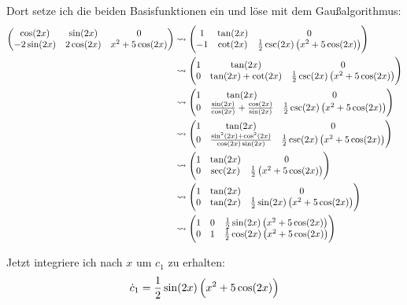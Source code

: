 \documentclass[11pt, ngerman]{article}
\begin{document}
Dort setze ich die beiden Basisfunktionen ein und löse mit dem Gaußalgorithmus:
\begin{align*}
	\begin{pmatrix}
		\cos(2x) & \sin(2x) & 0 \\
		- 2 \sin(2x) & 2 \cos(2x) & x^2 + 5 \cos(2x)
	\end{pmatrix}
	&\leadsto
	\begin{pmatrix}
		1 & \tan(2x) & 0 \\
		-1 & \cot(2x) & \frac 12 \csc(2x) \del{x^2 + 5 \cos(2x)}
	\end{pmatrix} \\
	&\leadsto
	\begin{pmatrix}
		1 & \tan(2x) & 0 \\
		0 & \tan(2x) + \cot(2x) & \frac 12 \csc(2x) \del{x^2 + 5 \cos(2x)}
	\end{pmatrix} \\
	&\leadsto
	\begin{pmatrix}
		1 & \tan(2x) & 0 \\
		0 & \frac{\sin(2x)}{\cos(2x)} + \frac{\cos(2x)}{\sin(2x)} & \frac 12 \csc(2x) \del{x^2 + 5 \cos(2x)}
	\end{pmatrix} \\
	&\leadsto
	\begin{pmatrix}
		1 & \tan(2x) & 0 \\
		0 & \frac{\sin^2(2x) + \cos^2(2x)}{\cos(2x)\sin(2x)} & \frac 12 \csc(2x) \del{x^2 + 5 \cos(2x)}
	\end{pmatrix} \\
	&\leadsto
	\begin{pmatrix}
		1 & \tan(2x) & 0 \\
		0 & \sec(2x) & \frac 12 \del{x^2 + 5 \cos(2x)}
	\end{pmatrix} \\
	&\leadsto
	\begin{pmatrix}
		1 & \tan(2x) & 0 \\
		0 & \tan(2x) & \frac 12 \sin(2x) \del{x^2 + 5 \cos(2x)}
	\end{pmatrix} \\
	&\leadsto
	\begin{pmatrix}
		1 & 0 & \frac 12 \sin(2x) \del{x^2 + 5 \cos(2x)} \\
		0 & 1 & \frac 12 \cos(2x) \del{x^2 + 5 \cos(2x)}
	\end{pmatrix} \\
\end{align*}

Jetzt integriere ich nach $x$ um $c_1$ zu erhalten:
\begin{align*}
	\dot c_1 &= \frac 12 \sin(2x) \del{x^2 + 5 \cos(2x)} \\
\end{align*}
\end{document}
